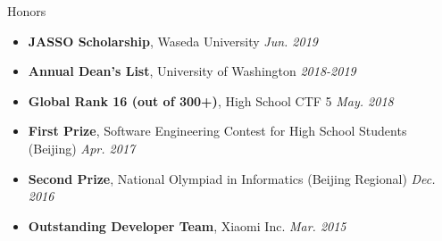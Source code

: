 \documentclass{resume}
\begin{document}
	\begin{rSection}{Honors}
		\begin{itemize}
			\setlength{\itemsep}{1pt}
			\setlength{\parskip}{0pt}
			\setlength{\parsep}{0pt}
			\item \textbf{JASSO Scholarship}, Waseda University \hfill {\em Jun. 2019}
			\item \textbf{Annual Dean's List}, University of Washington \hfill {\em 2018-2019}
			\item \textbf{Global Rank 16 (out of 300+)}, High School CTF 5 \hfill {\em May. 2018}
			\item \textbf{First Prize}, Software Engineering Contest for High School Students (Beijing) \hfill {\em Apr. 2017}
			\item \textbf{Second Prize}, National Olympiad in Informatics (Beijing Regional) \hfill {\em Dec. 2016}
			\item \textbf{Outstanding Developer Team}, Xiaomi Inc. \hfill {\em Mar. 2015}
		\end{itemize}
	\end{rSection}
\end{document}
